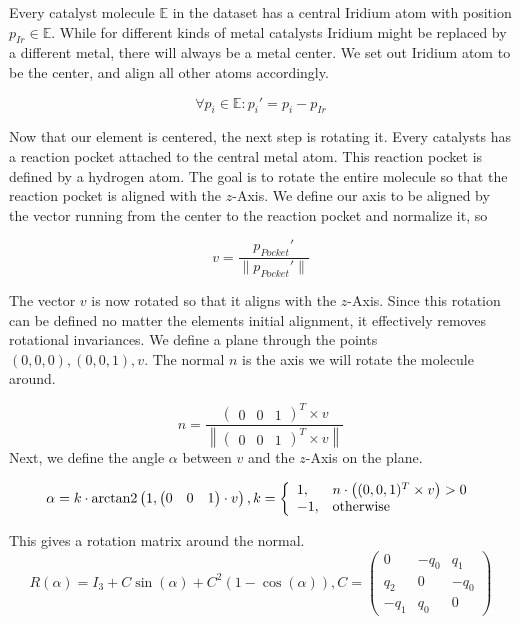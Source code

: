 Every catalyst molecule $\mathbb{E}$ in the dataset has a central Iridium atom with position $p_{Ir} \in \mathbb{E}$.
While for different kinds of metal catalysts Iridium might be replaced by a different metal, there will always be a metal center.
We set out Iridium atom to be the center, and align all other atoms accordingly.

$$ \forall p_i \in \mathbb{E}: p_i' = p_i - p_{Ir}$$

Now that our element is centered, the next step is rotating it.
Every catalysts has a reaction pocket attached to the central metal atom.
This reaction pocket is defined by a hydrogen atom.
The goal is to rotate the entire molecule so that the reaction pocket is aligned with the $z$-Axis.
We define our axis to be aligned by the vector running from the center to the reaction pocket and normalize it, so

$$ v = \frac{p_{Pocket}'}{\| p_{Pocket}'\| } $$

The vector $v$ is now rotated so that it aligns with the $z$-Axis.
Since this rotation can be defined no matter the elements initial alignment, it effectively removes rotational invariances.
We define a plane through the points $(0,0,0), (0,0,1), v$.
The normal $n$ is the axis we will rotate the molecule around.

$$
n =\frac{\begin{pmatrix}
  0 &
  0 &
  1
\end{pmatrix}^T \times v}{ \left\| \begin{pmatrix}
  0 &
  0 &
  1
\end{pmatrix}^T \times v \right\| }
$$
Next, we define the angle $\alpha$ between $v$ and the $z$-Axis on the plane.

$$ 
\alpha = k \cdot \operatorname{arctan2} \left( 1,  
\begin{pmatrix} 0 &  0 & 1 \end{pmatrix} \cdot v \right),\space k = \left\{\begin{array}{ll} 1, & n \cdot \left( (0,0,1)^T \times v \right) > 0 \\
  -1, & \text{otherwise}\end{array}\right.
$$

This gives a rotation matrix around the normal.
$$
R(\alpha) = I_3 + C \sin(\alpha) + C^2(1 - \cos(\alpha)), C =
\begin{pmatrix}
  0 & -q_0 & q_1 \\
  q_2 & 0 & -q_0\\
  -q_1 & q_0 & 0
\end{pmatrix}
$$


